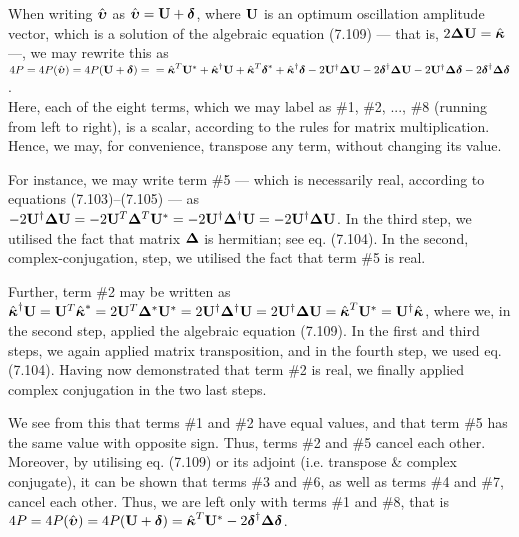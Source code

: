 \documentclass[a4paper,12pt]{article}
\newcommand{\bdelta}{\mbox{\boldmath ${\rm \delta}$}}
\newcommand{\bupsi}{\mbox{\boldmath ${\rm \upsilon}$}}
\newcommand{\bkappa}{\mbox{\boldmath $\rm \kappa$}}
\begin{document}
\noindent
When writing $\hat{\bupsi}$ as $\hat{\bupsi} = {\bf U} + {\bdelta}$, where ${\bf U}$ is an optimum oscillation amplitude vector, which is a solution of the algebraic equation (7.109) --- that is, \linebreak $2{\bf \Delta}{\bf U}=\hat{\bkappa}$ ---, we may rewrite this as 
$
4P=4P(\hat{\bupsi}) = 4P({\bf U} + {\bdelta})=  \\ 
         = \hat{\bkappa}^T {\bf U}^* + 
          \hat{\bkappa}^{\dagger} {\bf U} +  \hat{\bkappa}^T
          \bdelta^* + \hat{\bkappa}^{\dagger}\bdelta
           -{2} {\bf U}^{\dagger}{\bf \Delta}{\bf U}- {2}
          \bdelta^{\dagger} {\bf \Delta}{\bf U} -{2}{\bf U}^{\dagger}
          {\bf \Delta} \bdelta - {2} \bdelta^{\dagger}{\bf \Delta}\bdelta 
$.
\\ Here, each of the eight terms, which we may label as \#1, \#2, ..., \#8 (running from left to right), is a scalar, according to the rules for matrix multiplication. Hence, we may, for convenience, transpose any term, without changing its value. 

For instance, we may write term \#5 --- which is necessarily real, according to equations (7.103)--(7.105) --- as \\ ${- 2} {\bf U}^{\dagger}{\bf \Delta}{\bf U} = {- 2} {\bf U}^T{\bf \Delta}^T{\bf U}^* = -2 {\bf U}^{\dagger} {\bf \Delta}^{\dagger}{\bf U} = -2 {\bf U}^{\dagger}{\bf \Delta}{\bf U}$. In the third step, we utilised the fact that matrix ${\bf \Delta}$ is hermitian; see eq. (7.104). In the second, complex-conjugation, step, we utilised the fact that term \#5 is real. 

Further, term \#2 may be written as \\ 
$\hat{\bkappa}^{\dagger} {\bf U} =  {\bf U}^T \hat{\bkappa}^* = 2 {\bf U}^T {\bf \Delta}^*{\bf U}^* =  2 {\bf U}^{\dagger}{\bf \Delta}^{\dagger}{\bf U} =  2 {\bf U}^{\dagger}{\bf \Delta}{\bf U} = \hat{\bkappa}^T {\bf U}^* =  {\bf U}^{\dagger} \hat{\bkappa}$, where we, in the second step, applied the algebraic equation (7.109). In the first and third steps, we again applied matrix transposition, and in the fourth step, we used eq. (7.104). Having now demonstrated that term \#2 is real, we finally applied complex conjugation in the two last steps.

We see from this that terms \#1 and \#2 have equal values, and that term \#5 has the same value with opposite sign. Thus, terms \#2 and \#5 cancel each other. Moreover, by utilising eq. (7.109) or its adjoint (i.e. transpose \& complex conjugate), it can be shown that terms \#3 and \#6, as well as terms \#4 and \#7, cancel each other. Thus, we are left only with terms \#1 and \#8, that is %
$
4P=4P(\hat{\bupsi})=4P({\bf U} + {\bdelta})=\hat{\bkappa}^T {\bf U}^* -2 \bdelta^{\dagger}{\bf \Delta}\bdelta 
$.
\end{document}
